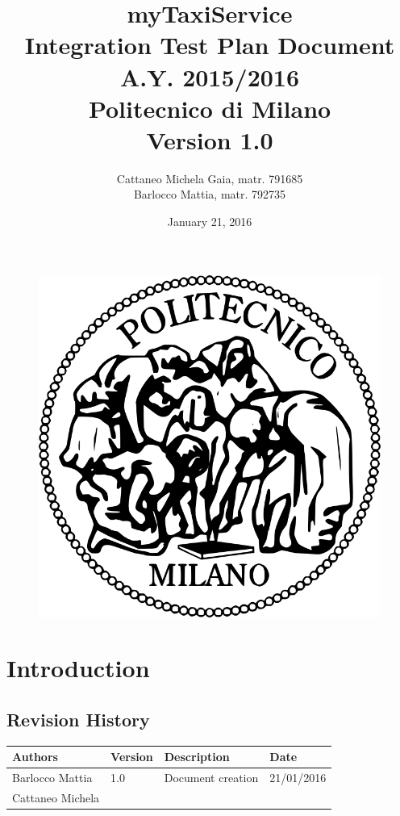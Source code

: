 \documentclass[18pt,oneside,a4paper, titlepage]{article}
\begin{document}
\begin{figure}[t]
	\centering
	\includegraphics[scale=0.35]{logo-polimi.png}
\end{figure}
\title{\textbf{myTaxiService}\\\textbf{I}ntegration \textbf{T}est \textbf{P}lan \textbf{D}ocument\\ A.Y. 2015/2016\\
	Politecnico di Milano \\ Version 1.0}	
\author{Cattaneo Michela Gaia, matr. 791685\\Barlocco Mattia, matr. 792735 }
\date{January 21, 2016}
\maketitle

\newpage
	\tableofcontents

\newpage
\section{Introduction}
	\subsection{Revision History}
		\begin{center}
			\centering
			\begin{tabular}{l l l l}
				\hline		\textbf{Authors} & \textbf{Version} & \textbf{Description} & \textbf{Date}\\
				\hline		Barlocco Mattia & 1.0 & Document creation & 21/01/2016\\
				      Cattaneo Michela & & & \\
				\hline
			\end{tabular}
		\end{center}
\end{document}
